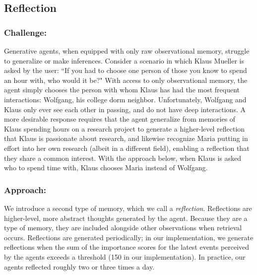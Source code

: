 \subsection{Reflection}

\subsubsection*{Challenge:} Generative agents, when equipped with only raw observational memory, struggle to generalize or make inferences. Consider a scenario in which Klaus Mueller is asked by the user: ``If you had to choose one person of those you know to spend an hour with, who would it be?" With access to only observational memory, the agent simply chooses the person with whom Klaus has had the most frequent interactions: Wolfgang, his college dorm neighbor. Unfortunately, Wolfgang and Klaus only ever see each other in passing, and do not have deep interactions. A more desirable response requires that the agent generalize from memories of Klaus spending hours on a research project to generate a higher-level reflection that Klaus is passionate about research, and likewise recognize Maria putting in effort into her own research (albeit in a different field), enabling a reflection that they share a common interest. With the approach below, when Klaus is asked who to spend time with, Klaus chooses Maria instead of Wolfgang. 

\subsubsection*{Approach: } We introduce a second type of memory, which we call a \textit{reflection}. Reflections are higher-level, more abstract thoughts generated by the agent. Because they are a type of memory, they are included alongside other observations when retrieval occurs. Reflections are generated periodically; in our implementation, we generate reflections when the sum of the importance scores for the latest events perceived by the agents exceeds a threshold (150 in our implementation). In practice, our agents reflected roughly two or three times a day.


